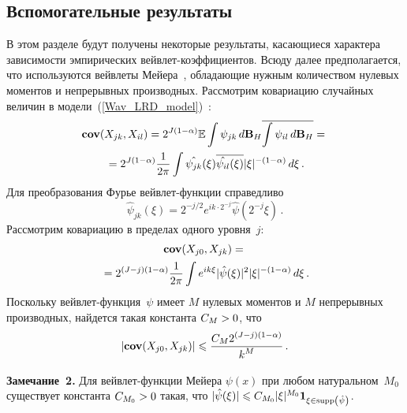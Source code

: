 \begin{multicols}{2}
\section{Вспомогательные результаты}

В этом разделе будут получены некоторые результаты, касающиеся характера 
зависимости эмпирических вейв\-лет-ко\-эф\-фи\-ци\-ен\-тов. Всюду далее предполагается, 
что используются вейвлеты \mbox{Мейера}~\cite{14-she}, обладающие нужным количеством нулевых 
моментов и непрерывных производных. Рассмотрим ковариацию случайных величин в 
модели~(\ref{Wav_LRD_model})~\cite{16-she}:
\begin{multline*}
\textbf{cov}(X_{jk},X_{il})= 2^{J(1-\alpha)} \mathbb{E} \int \psi_{jk} \,
d\mathbf{B}_H \overline{\int \psi_{il}\, d\mathbf{B}_H}={}\\
{}=
2^{J(1-\alpha)}\displaystyle\frac{\displaystyle 1\mathstrut}{\displaystyle 2\pi\mathstrut} \int \hat{\psi_{jk}}(\xi)
\overline{\hat{\psi_{il}}(\xi)}|\xi|^{-(1-\alpha)}\, d\xi\,.
\end{multline*}
Для преобразования Фурье вейв\-лет-функ\-ции справедливо
$$\hat{\psi}_{jk}(\xi) = 2^{-j/2} e^{ik\cdot 2^{-j}}\hat{\psi}(2^{-j}\xi)\,.
$$
Рассмотрим ковариацию в пределах одного уровня~$j$:
\begin{multline*}
\textbf{cov}(X_{j0},X_{jk}) ={}\\
{}=
2^{(J-j)(1-\alpha)} \displaystyle\frac{\displaystyle 1\mathstrut}{\displaystyle 2\pi\mathstrut}\int e^{ik\xi}|\hat{\psi}(\xi)|^2 |\xi|^{-(1-\alpha)}\,d\xi\,.
\end{multline*}
Поскольку вейв\-лет-функ\-ция~$\psi$ имеет $M$ нулевых моментов и $M$ непрерывных 
производных, найдется такая константа $C_M\hm>0$, что
\begin{equation}
|\textbf{cov}(X_{j0},X_{jk})| \leqslant  \displaystyle\frac{\displaystyle C_M 2^{(J-j)(1-\alpha)}\mathstrut}{\displaystyle k^M\mathstrut}\,.
\label{Cov_Single_Decay}
\end{equation}


\smallskip

\noindent
\textbf{Замечание~2.}
Для вейв\-лет-функ\-ции Мейера $\psi(x)$ при любом натуральном~$M_0$ существует 
константа $C_{M_0}\hm>0$ такая, что $|\hat{\psi}(\xi)|\hm\leqslant C_{M_0} |\xi|^{M_0} 
\mathbf{1}_{\xi \in \mathrm{supp}\left(\hat{\psi}\right)}$.

\smallskip


\end{multicols}
